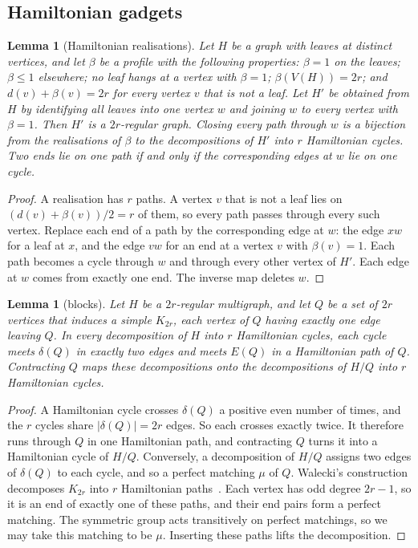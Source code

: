 \documentclass[11pt]{amsart}
\newtheorem{lemma}[theorem]{Lemma}
\theoremstyle{definition}
\begin{document}
\subsection{Hamiltonian gadgets}

\begin{lemma}[Hamiltonian realisations]\label{lem:hamreal}
Let $H$ be a graph with leaves at distinct vertices, and let $\beta$ be a profile with the following
properties: $\beta=1$ on the leaves; $\beta\le1$ elsewhere; no leaf hangs at a vertex with $\beta=1$;
$\beta(V(H))=2r$; and $d(v)+\beta(v)=2r$ for every vertex $v$ that is not a leaf. Let $H'$ be obtained
from $H$ by identifying all leaves into one vertex $w$ and joining $w$ to every vertex with $\beta=1$.
Then $H'$ is a $2r$-regular graph. Closing every path through $w$ is a bijection from the realisations
of $\beta$ to the decompositions of $H'$ into $r$ Hamiltonian cycles. Two ends lie on one path if and
only if the corresponding edges at $w$ lie on one cycle.
\end{lemma}

\begin{proof}
A realisation has $r$ paths. A vertex $v$ that is not a leaf lies on $(d(v)+\beta(v))/2=r$ of them,
so every path passes through every such vertex. Replace each end of a path by the corresponding edge
at $w$: the edge $xw$ for a leaf at $x$, and the edge $vw$ for an end at a vertex $v$ with
$\beta(v)=1$. Each path becomes a cycle through $w$ and through every other vertex of $H'$. Each edge
at $w$ comes from exactly one end. The inverse map deletes $w$.
\end{proof}

\begin{lemma}[blocks]\label{lem:blocks}
Let $H$ be a $2r$-regular multigraph, and let $Q$ be a set of $2r$ vertices that induces a simple
$K_{2r}$, each vertex of $Q$ having exactly one edge leaving $Q$. In every decomposition of $H$ into $r$
Hamiltonian cycles, each cycle meets $\delta(Q)$ in exactly two edges and meets $E(Q)$ in a Hamiltonian
path of $Q$. Contracting $Q$ maps these decompositions onto the decompositions of $H/Q$ into $r$
Hamiltonian cycles.
\end{lemma}

\begin{proof}
A Hamiltonian cycle crosses $\delta(Q)$ a positive even number of times, and the $r$ cycles share
$|\delta(Q)|=2r$ edges. So each crosses exactly twice. It therefore runs through $Q$ in one Hamiltonian
path, and contracting $Q$ turns it into a Hamiltonian cycle of $H/Q$. Conversely, a decomposition of
$H/Q$ assigns two edges of $\delta(Q)$ to each cycle, and so a perfect matching $\mu$ of $Q$. Walecki's
construction decomposes $K_{2r}$ into $r$ Hamiltonian paths~\cite{Als08}. Each vertex has odd degree
$2r-1$, so it is an end of exactly one of these paths, and their end pairs form a perfect matching.
The symmetric group acts transitively on perfect matchings, so we may take this matching to be $\mu$.
Inserting these paths lifts the decomposition.
\end{proof}
\end{document}
